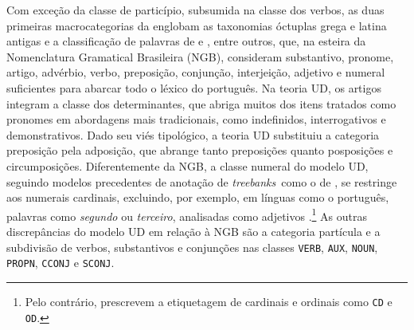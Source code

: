 \documentclass[portuguese]{textolivre}
\newcommand{\tbs}{\textit{treebanks}}
\begin{document}
Com exceção da classe de particípio, subsumida na classe dos verbos, as duas primeiras macrocategorias da  englobam as taxonomias óctuplas grega e latina antigas \parencite{Robins1966-ROBTDO-13} e a classificação de palavras de \textcite{macambira1999} e \textcite{rocha2011gramatica}, entre outros, que, na esteira da Nomenclatura Gramatical Brasileira (NGB), consideram substantivo, pronome, artigo, advérbio, verbo, preposição, conjunção, interjeição, adjetivo e numeral suficientes para abarcar todo o léxico do português. Na teoria UD, os artigos integram a classe dos determinantes, que abriga muitos dos itens tratados como pronomes em abordagens mais tradicionais, como indefinidos, interrogativos e demonstrativos. Dado seu viés tipológico, a teoria UD substituiu a categoria preposição pela adposição, que abrange tanto preposições quanto posposições e circumposições. Diferentemente da NGB, a classe numeral do modelo UD, seguindo modelos precedentes de anotação de \tbs~como o de \textcite{santorini1990}, se restringe aos numerais cardinais, excluindo, por exemplo, em línguas como o português, palavras como \textit{segundo} ou \textit{terceiro}, analisadas como adjetivos \parencite{duran2021manual}.\footnote{Pelo contrário, \textcite{francis1979manual} prescrevem a etiquetagem de cardinais e ordinais como \texttt{CD} e \texttt{OD}.} As outras discrepâncias do modelo UD em relação à NGB são a categoria partícula e a subdivisão de verbos, substantivos e conjunções nas classes \texttt{VERB}, \texttt{AUX}, \texttt{NOUN}, \texttt{PROPN}, \texttt{CCONJ} e \texttt{SCONJ}. 
\end{document}
